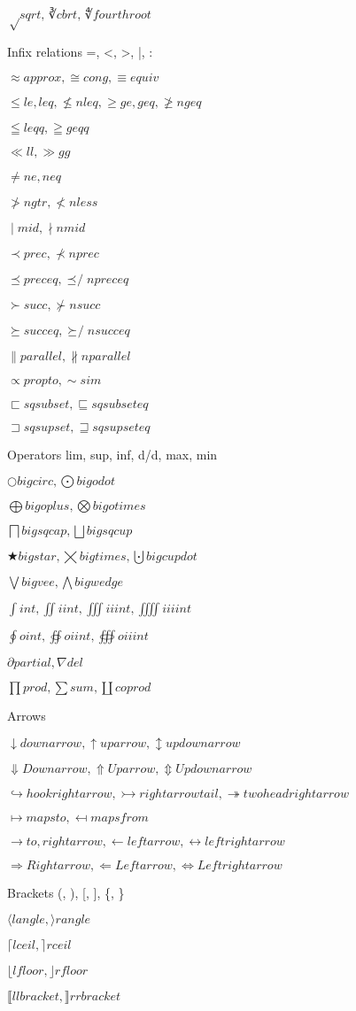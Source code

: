 \documentclass{article}
\begin{document}
$√ sqrt, ∛ cbrt, ∜ fourthroot$

Infix relations =, <, >, |, :

$≈ approx, ≅ cong, ≡ equiv$

$≤ le, leq, ≰ nleq, ≥ ge, geq, ≱ ngeq$

$≦ leqq, ≧ geqq$

$≪ ll, ≫ gg$

$≠ ne, neq$

$≯ ngtr, ≮ nless$

$∣ mid, ∤ nmid$

$≺ prec, ⊀ nprec$

$⪯ preceq, ⪯̸ npreceq$

$≻ succ, ⊁ nsucc$

$⪰ succeq, ⪰̸ nsucceq$

$∥ parallel, ∦ nparallel$

$∝ propto, ∼ sim$

$⊏ sqsubset, ⊑ sqsubseteq$

$⊐ sqsupset, ⊒ sqsupseteq$

Operators lim, sup, inf, d/d, max, min

$○ bigcirc, ⨀ bigodot$

$⨁ bigoplus, ⨂ bigotimes$

$⨅ bigsqcap, ⨆ bigsqcup$

$★ bigstar, ⨉ bigtimes, ⨃ bigcupdot$

$⋁ bigvee, ⋀ bigwedge$

$∫ int, ∬ iint, ∭ iiint, ⨌ iiiint$

$∮ oint, ∯ oiint, ∰ oiiint$

$∂ partial, ∇ del$

$∏ prod, ∑ sum, ∐ coprod$

Arrows 

$↓ downarrow, ↑ uparrow, ↕ updownarrow$

$⇓ Downarrow, ⇑ Uparrow, ⇕ Updownarrow$

$↪ hookrightarrow, ↣ rightarrowtail, ↠ twoheadrightarrow$

$↦ mapsto, ↤ mapsfrom$

$→ to, rightarrow, ← leftarrow, ↔ leftrightarrow$

$⇒ Rightarrow, ⇐ Leftarrow, ⇔ Leftrightarrow$

Brackets (, ), [, ], \{, \}

$⟨ langle, ⟩ rangle$

$⌈ lceil, ⌉ rceil$

$⌊ lfloor, ⌋ rfloor$

$⟦ llbracket, ⟧ rrbracket$
\end{document}
